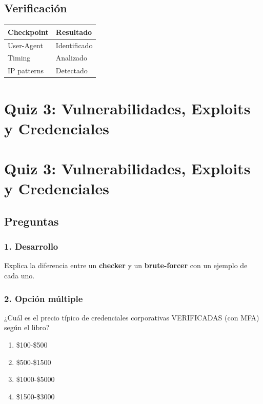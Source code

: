 \documentclass[
  letterpaper,
]{report}
\newcounter{none} %
\providecommand{\tightlist}{%
  \setlength{\itemsep}{0pt}\setlength{\parskip}{0pt}}
\begin{document}
\section{Verificación}\label{verificaciuxf3n-1}

{\def\LTcaptype{none} %
\begin{longtable}[]{@{}ll@{}}
\toprule\noalign{}
Checkpoint & Resultado \\
\midrule\noalign{}
\endhead
\bottomrule\noalign{}
\endlastfoot
User-Agent & Identificado \\
Timing & Analizado \\
IP patterns & Detectado \\
\end{longtable}
}

\chapter{Quiz 3: Vulnerabilidades, Exploits y
Credenciales}\label{quiz-3-vulnerabilidades-exploits-y-credenciales}

\chapter{Quiz 3: Vulnerabilidades, Exploits y
Credenciales}\label{quiz-3-vulnerabilidades-exploits-y-credenciales-1}

\section{Preguntas}\label{preguntas-2}

\subsection{1. Desarrollo}\label{desarrollo-1}

Explica la diferencia entre un \textbf{checker} y un
\textbf{brute-forcer} con un ejemplo de cada uno.

\subsection{2. Opción múltiple}\label{opciuxf3n-muxfaltiple-1}

¿Cuál es el precio típico de credenciales corporativas VERIFICADAS (con
MFA) según el libro?

\begin{enumerate}
\def\labelenumi{\alph{enumi})}
\tightlist
\item
  \$100-\$500\\
\item
  \$500-\$1500\\
\item
  \$1000-\$5000\\
\item
  \$1500-\$3000
\end{enumerate}
\end{document}
